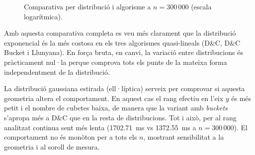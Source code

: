\documentclass[conference,compsoc]{IEEEtran}
\begin{document}
\begin{figure}[H]
    \centering
    \distdata
    \caption{Comparativa per distribució i algorisme a $n=300\,000$ (escala logarítmica).}
    \label{fig:dist_bar}
\end{figure}

Amb aquesta comparativa completa es veu més clarament que la distribució
exponencial és la més costosa en els tres algorismes quasi-lineals
(D\&C, D\&C Bucket i Llunyana). En força bruta, en canvi,
la variació entre distribucions és pràcticament nul·la perque
comprova tots els punts de la mateixa forma independentment de la distribució.

La distribució gaussiana estirada (ell·líptica) serveix per comprovar si
aquesta geometria altera el comportament. En aquest cas el rang
efectiu en l'eix $y$ és més petit i el nombre de cubetes baixa, de manera
que la variant amb \textit{buckets} s'apropa més a D\&C que en la resta de
distribucions. Tot i això, per al rang analitzat continua sent més lenta
(1702.71~ms vs 1372.55~ms a $n=300\,000$). El comportament no és monòton
per a tots els $n$, mostrant sensibilitat a la geometria i al soroll de mesura.
\end{document}
